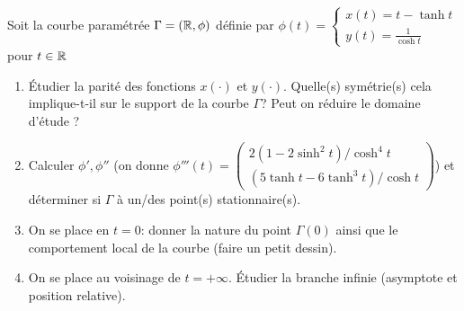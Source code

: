 \documentclass[a4paper]{tp_um}
\begin{document}
		
		
		
		
\exo{}  Soit la courbe paramétrée $\Gamma=\left( \mathbb{R}, \phi \right)$ définie par $ \phi(t) = \begin{cases}x(t)= t - \tanh t \\ y(t) = \frac{1}{\cosh t} \end{cases}$ pour $t\in\mathbb{R}$

	\begin{enumerate}
        \item \'Etudier la parité des fonctions $x(\cdot)$ et $y(\cdot)$. Quelle(s) symétrie(s) cela implique-t-il sur le support de la courbe $\Gamma$? Peut on réduire le domaine d'étude ?
			\blanc{5cm}


                    \item Calculer $\phi', \phi''$ (on donne $\phi'''(t)=\begin{pmatrix}
                                2(1- 2\sinh^2 t) /\cosh^4t \\ (5\tanh t - 6 \tanh^3 t ) / \cosh t  
                    \end{pmatrix}$) et déterminer si $\Gamma$ à un/des point(s) stationnaire(s).
			\blanc{9cm}


        \item On se place en $t=0$: donner la nature du point $\Gamma(0)$ ainsi que le comportement local de la courbe (faire un petit dessin).
			\blanc{13cm}
	
        \item On se place au voisinage de $t=+\infty$. Étudier la branche infinie (asymptote et position relative).

			\blanc{7cm}
		

\end{enumerate}
\end{document}
